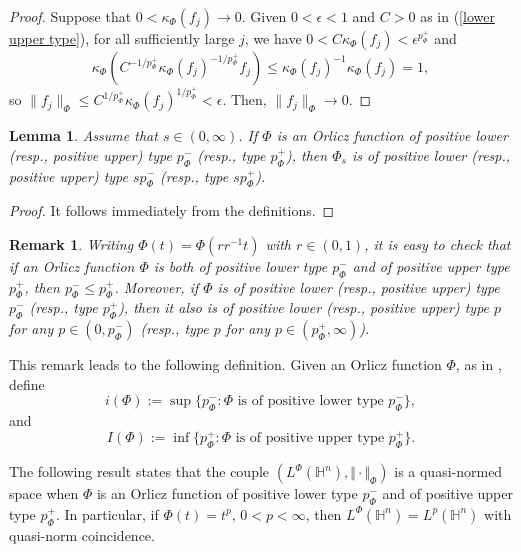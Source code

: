 \documentclass[oneside,10pt]{article}
\newtheorem{lemma}[theorem]{Lemma}
\newtheorem{remark}[theorem]{Remark}
\begin{document}
\begin{proof}
Suppose that $0< \kappa_{\Phi}(f_j) \to 0$. Given $0 < \epsilon < 1$ and $C > 0$ as in (\ref{lower upper type}), for all sufficiently 
large $j$, we have $0 < C \kappa_{\Phi}(f_j) < \epsilon^{p_{\Phi}^{+}}$ and
\[
\kappa_{\Phi} \left( C^{-1/p_{\Phi}^{+}} \kappa_{\Phi}(f_j)^{-1/p_{\Phi}^{+}} f_j \right)  \leq \kappa_{\Phi}(f_j)^{-1} \kappa_{\Phi}(f_j) = 1, 
\]
so $\| f_j \|_{\Phi} \leq C^{1/p_{\Phi}^{+}} \kappa_{\Phi}(f_j)^{1/p_{\Phi}^{+}} < \epsilon$. Then, $\| f_j \|_{\Phi} \to 0$.
\end{proof}



\begin{lemma} \label{lower upper fits}
Assume that $s \in (0, \infty)$. If $\Phi$ is an Orlicz function of positive lower (resp., positive upper) type $p_{\Phi}^{-}$ 
(resp., type $p_{\Phi}^{+}$),  then $\Phi_s$ is of positive lower (resp., positive upper) type  $s p_{\Phi}^{-}$ 
(resp., type $s p_{\Phi}^{+}$). 
\end{lemma}

\begin{proof}
It follows immediately from the definitions.
\end{proof}

\begin{remark}
Writing $\Phi(t) = \Phi(r r^{-1} t)$ with $r \in (0,1)$, it is easy to check that if an Orlicz function 
$\Phi$ is both of positive lower type $p_{\Phi}^{-}$ and of positive upper type $p_{\Phi}^{+}$, then $p_{\Phi}^{-} \leq p_{\Phi}^{+}$. 
Moreover, if $\Phi$ is of positive lower (resp., positive upper) type $p_{\Phi}^{-}$ 
(resp., type $p_{\Phi}^{+}$), then it also is of positive lower (resp., positive upper) type $p$ for any $p \in (0, p_{\Phi}^{-})$ 
(resp., type $p$ for any $p \in (p_{\Phi}^{+}, \infty)$).
\end{remark}

This remark leads to the following definition. Given an Orlicz function $\Phi$, as in \cite[Section 2.1]{Ky}, define
\begin{equation} \label{p menos}
i(\Phi) := \sup \{ p_{\Phi}^{-} : \Phi \,\, \text{is of positive lower type} \,\, p_{\Phi}^{-} \},
\end{equation}
and
\begin{equation} \label{p mas}
I(\Phi) := \inf \{ p_{\Phi}^{+} : \Phi \,\, \text{is of positive upper type} \,\, p_{\Phi}^{+} \}.
\end{equation}

The following result states that the couple $\left(L^{\Phi}(\mathbb{H}^n), \Vert \cdot \Vert_{\Phi} \right)$ is a quasi-normed space 
when $\Phi$ is an Orlicz function of positive lower type $p_{\Phi}^{-}$ and of positive upper type $p_{\Phi}^{+}$. In particular, if 
$\Phi(t) = t^p$, $0 < p < \infty$, then $L^{\Phi}(\mathbb{H}^n) = L^p(\mathbb{H}^n)$ with quasi-norm coincidence.
\end{document}

